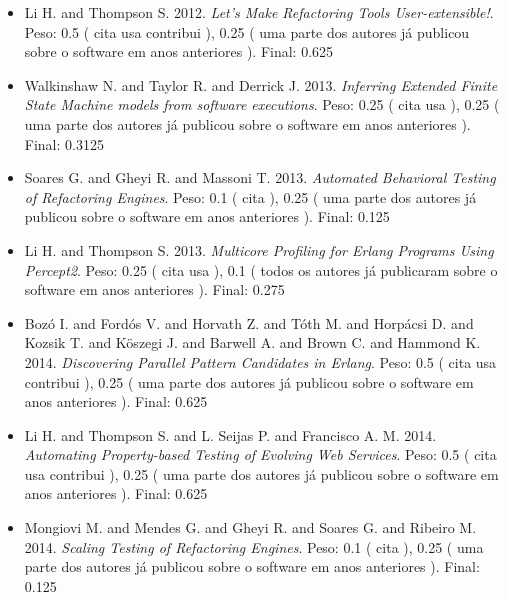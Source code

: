 \begin{itemize}
\item Li H. and Thompson S.
      2012.
        \textit{ Let's Make Refactoring Tools User-extensible!}.
      Peso:
      0.5 (
          cita
          usa
          contribui
      ),
      0.25 (
uma parte dos autores já publicou sobre o software em anos anteriores
      ).
      Final:
      0.625

\item Walkinshaw N. and Taylor R. and Derrick J.
      2013.
        \textit{ Inferring Extended Finite State Machine models from software executions}.
      Peso:
      0.25 (
          cita
          usa
      ),
      0.25 (
uma parte dos autores já publicou sobre o software em anos anteriores
      ).
      Final:
      0.3125

\item Soares G. and Gheyi R. and Massoni T.
      2013.
        \textit{ Automated Behavioral Testing of Refactoring Engines}.
      Peso:
      0.1 (
          cita
      ),
      0.25 (
uma parte dos autores já publicou sobre o software em anos anteriores
      ).
      Final:
      0.125

\item Li H. and Thompson S.
      2013.
        \textit{ Multicore Profiling for Erlang Programs Using Percept2}.
      Peso:
      0.25 (
          cita
          usa
      ),
      0.1 (
todos os autores já publicaram sobre o software em anos anteriores
      ).
      Final:
      0.275

\item Boz\'{o} I. and Ford\'{o}s V. and Horvath Z. and T\'{o}th M. and Horp\'{a}csi D. and Kozsik T. and K\"{o}szegi J. and Barwell A. and Brown C. and Hammond K.
      2014.
        \textit{ Discovering Parallel Pattern Candidates in Erlang}.
      Peso:
      0.5 (
          cita
          usa
          contribui
      ),
      0.25 (
uma parte dos autores já publicou sobre o software em anos anteriores
      ).
      Final:
      0.625

\item Li H. and Thompson S. and L. Seijas P. and Francisco A. M.
      2014.
        \textit{ Automating Property-based Testing of Evolving Web Services}.
      Peso:
      0.5 (
          cita
          usa
          contribui
      ),
      0.25 (
uma parte dos autores já publicou sobre o software em anos anteriores
      ).
      Final:
      0.625

\item Mongiovi M. and Mendes G. and Gheyi R. and Soares G. and Ribeiro M.
      2014.
        \textit{ Scaling Testing of Refactoring Engines}.
      Peso:
      0.1 (
          cita
      ),
      0.25 (
uma parte dos autores já publicou sobre o software em anos anteriores
      ).
      Final:
      0.125


\end{itemize}

